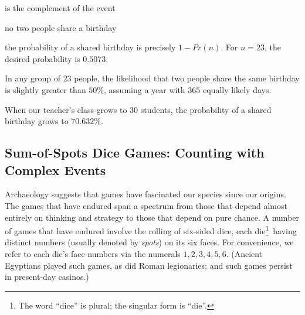 \smallskip

\noindent
is the complement of the event

\smallskip

\hspace*{.25in}no two people share a birthday

\smallskip

\noindent
the probability of a shared birthday is precisely $1-Pr(n)$.  For $n=23$, the desired probability is $0.5073$.

\begin{prop}
In any group of $23$ people, the likelihood that two people share the same birthday is slightly greater than $50\%$, assuming a year with $365$ equally likely days.
\end{prop}

When our teacher's class grows to 30 students, the probability of a shared birthday grows to $70.632\%$.


\subsection{Sum-of-Spots Dice Games: Counting with Complex Events}
\label{sec:three-dice}

Archaeology suggests that games have fascinated our species since our origins.  The games that have endured span a spectrum from those that depend almost entirely on thinking and strategy to those that depend on pure chance.  A number of games that have endured involve the rolling of six-sided dice, each die\footnote{The word ``dice'' is plural; the singular form is ``die''.}~having distinct numbers (usually denoted by {\it spots}) on its six faces.  For convenience, we refer to each die's face-numbers via the numerals $1, 2, 3, 4, 5, 6$. (Ancient Egyptians played such games, as did Roman legionaries;  and such games persist in present-day casinos.)

\smallskip

